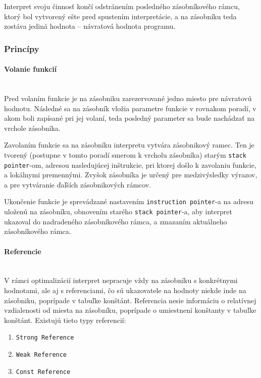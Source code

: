 \documentclass[12pt,a4paper,titlepage,final]{article}
\begin{document}
Interpret svoju činnosť končí odstránením posledného zásobníkového rámcu, ktorý bol vytvorený ešte pred spustením
interpretácie, a na zásobníku teda zostáva jediná hodnota -- návratová hodnota programu. 

\subsubsection{Princípy}

\paragraph{Volanie funkcií}\mbox{}\\

Pred volaním funkcie je na zásobniku zarezervované jedno miesto pre návratovú hodnotu.
Následné sa na zásobník vložia parametre funkcie v rovnakom poradí, v akom boli zapísané pri
jej volaní, teda posledný parameter sa bude nachádzať na vrchole zásobníka. 

Zavolaním funkcie sa na zásobníku interpretu vytvára zásobnikový ramec. Ten je tvorený (postupne v tomto
poradí smerom k vrcholu zásobníka) starým \texttt{stack pointer}-om, adresou nasledujúcej inštrukcie, pri ktorej došlo k
zavolaniu funkcie, a lokálnymi premennými. Zvyšok zásobníka je určený pre medzivýsledky výrazov, a pre
vytváranie ďaľších zásobnikových rámcov.

Ukončenie funkcie je sprevádzané nastavením \texttt{instruction pointer}-a na adresu uloženú na zásobníku,
obnovením starého \texttt{stack pointer}-a, aby interpret ukazoval do nadradeného zásobníkového rámca,
a zmazaním aktuálneho zásobníkového rámca.

\paragraph{Referencie}\mbox{}\\

V rámci optimalizácií interpret nepracuje vždy na zásobníku s konkrétnymi hodnotami,
ale aj s referenciami, čo sú ukazovatele na hodnoty niekde inde na zásobniku, poprípade
v tabuľke konštánt. Referencia nesie informáciu o relatívnej vzdialenosti od miesta
na zásobníku, poprípade o umiestnení konštanty v tabuľke konštánt. Existujú tieto typy referencií:

\begin{enumerate}
    \itemsep0em
    \item \texttt{Strong Reference}
    \item \texttt{Weak Reference}
    \item \texttt{Const Reference}
\end{enumerate}
\end{document}
